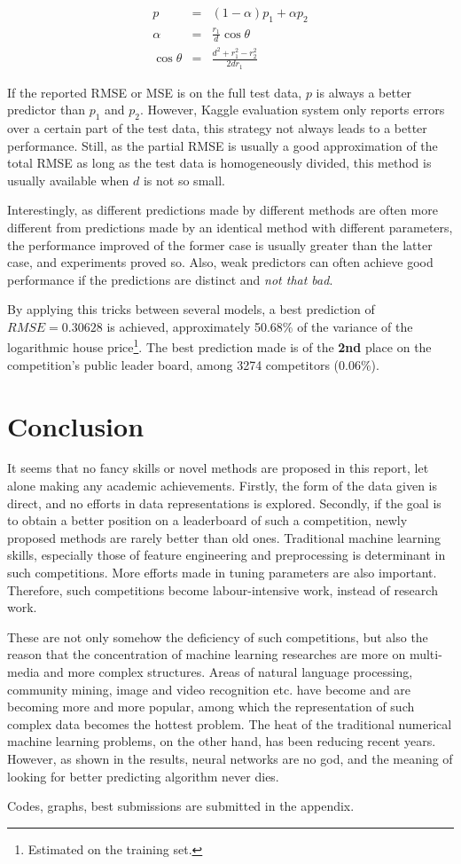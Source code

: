 \documentclass{article}
\begin{document}
\begin{eqnarray*}
  p &=& (1-\alpha) p_1 + \alpha p_2 \\
  \alpha &=& \frac{r_1}{d}\cos\theta \\
  \cos\theta &=& \frac{d^2+r_1^2-r_2^2}{2dr_1}
\end{eqnarray*}

If the reported RMSE or MSE is on the full test data, $p$ is always a better predictor than $p_1$ and $p_2$. However, Kaggle evaluation system only reports errors over a certain part of the test data, this strategy not always leads to a better performance. Still, as the partial RMSE is usually a good approximation of the total RMSE as long as the test data is homogeneously divided, this method is usually available when $d$ is not so small.

Interestingly, as different predictions made by different methods are often more different from predictions made by an identical method with different parameters, the performance improved of the former case is usually greater
than the latter case, and experiments proved so. Also, weak predictors can often achieve good performance if the predictions are distinct and \textit{not that bad}.

By applying this tricks between several models, a best prediction of \textbf{$RMSE=0.30628$} is achieved, approximately 50.68\% of the variance of the logarithmic house price\footnote{Estimated on the training set. }. The best prediction made is of the \textbf{2nd} place on the competition's public leader board, among 3274 competitors (0.06\%).

\section{Conclusion}
It seems that no fancy skills or novel methods are proposed in this report, let alone making any academic achievements. Firstly, the form of the data given is direct, and no efforts in data representations is explored. Secondly, if the goal is to obtain a better position on a leaderboard of such a competition, newly proposed methods are rarely better than old ones. Traditional machine learning skills, especially those of feature engineering and preprocessing is determinant in such competitions. More efforts made in tuning parameters are also important. Therefore, such competitions become labour-intensive work, instead of research work.

These are not only somehow the deficiency of such competitions, but also the reason that the concentration of machine learning researches are more on multi-media and more complex structures. Areas of natural language processing, community mining, image and video recognition etc. have become and are becoming more and more popular, among which the representation of such complex data becomes the hottest problem. The heat of the traditional numerical machine learning problems, on the other hand, has been reducing recent years. However, as shown in the results, neural networks are no god, and the meaning of looking for better predicting algorithm never dies.

\nocite{kerA}
\nocite{kerB}
\nocite{kerC}




\appendix
Codes, graphs, best submissions are submitted in the appendix.
\end{document}

